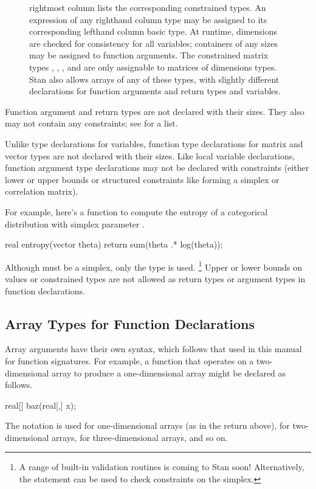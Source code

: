 \begin{figure}
{  rightmost column lists the corresponding constrained types.  An
  expression of any righthand column type may be assigned to its
  corresponding lefthand column basic type.  At runtime, dimensions
  are checked for consistency for all variables; containers of any
  sizes may be assigned to function arguments.  The constrained matrix
  types , ,
  , and
   are only assignable to matrices of
  dimensions  types. Stan also allows arrays of any
  of these types, with slightly different declarations for function
  arguments and return types and variables.
}\label{constrained-types.figure}
\end{figure}

Function argument and return types are not declared with their sizes.
They also may not contain any constraints;  see
 for a list.

Unlike type declarations for variables, function type declarations for
matrix and vector types are not declared with their sizes.  Like local
variable declarations, function argument type declarations may not be
declared with constraints (either lower or upper bounds or structured
constraints like forming a simplex or correlation matrix).

For example, here's a function to compute the entropy of a categorical
distribution with simplex parameter .
%
\begin{stancode}
real entropy(vector theta) {
  return sum(theta .* log(theta));
}
\end{stancode}
%
Although  must be a simplex, only the type 
is used.%
%
\footnote{A range of built-in validation routines is coming to Stan soon!
Alternatively, the  statement can be used to check
constraints on the simplex.} 
%
Upper or lower bounds on values or constrained types are not allowed
as return types or argument types in function declarations.  

\subsection{Array Types for Function Declarations}

Array arguments have their own syntax, which follows that used in this
manual for function signatures.  For example, a function that operates
on a two-dimensional array to produce a one-dimensional array might be
declared as follows.
%
\begin{stancode}
real[] baz(real[,] x);
\end{stancode}
%
The notation \code{[\,]} is used for one-dimensional arrays (as in the
return above), \code{[\,,\,]} for two-dimensional arrays,
\code{[\,,\,,\,]} for three-dimensional arrays, and so on.  

